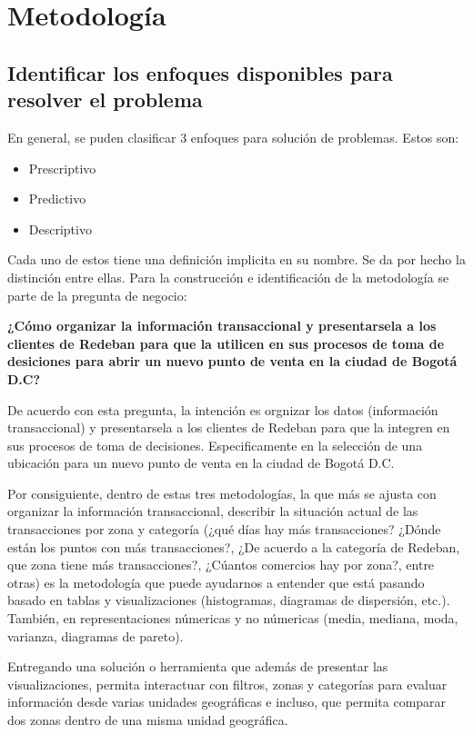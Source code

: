 \documentclass[a4paper]{article}
\begin{document}
\section{Metodología}
\subsection{Identificar los enfoques disponibles para resolver el problema}

En general, se puden clasificar 3 enfoques para solución de problemas. Estos son:

\begin{itemize}
	\item Prescriptivo
	\item Predictivo
	\item Descriptivo
\end{itemize}

Cada uno de estos tiene una definición implicita en su nombre. Se da por hecho la distinción entre ellas. Para la construcción e identificación de la metodología se parte de la pregunta de negocio:

\begin{center}
	\textbf{¿Cómo organizar la información transaccional y presentarsela a los clientes de Redeban para que la utilicen en sus procesos de toma de desiciones para abrir un nuevo punto de venta en la ciudad de Bogotá D.C?}
\end{center}

De acuerdo con esta pregunta, la intención es orgnizar los datos (información transaccional) y presentarsela a los clientes de Redeban para que la integren en sus procesos de toma de decisiones. Especificamente en la selección de una ubicación para un nuevo punto de venta en la ciudad de Bogotá D.C.

Por consiguiente, dentro de estas tres metodologías, la que más se ajusta con organizar la información transaccional, describir la situación actual de las transacciones por zona y categoría (¿qué días hay más transacciones? ¿Dónde están los puntos con más transacciones?, ¿De acuerdo a la categoría de Redeban, que zona tiene más transacciones?, ¿Cúantos comercios hay por zona?, entre otras) es la metodología que puede ayudarnos a entender que está pasando basado en tablas y visualizaciones (histogramas, diagramas de dispersión, etc.). También, en representaciones númericas y no númericas (media, mediana, moda, varianza, diagramas de pareto).

Entregando una solución o herramienta que además de presentar las visualizaciones, permita interactuar con filtros, zonas y categorías para evaluar información desde varias unidades geográficas e incluso, que permita comparar dos zonas dentro de una misma unidad geográfica.
\end{document}
